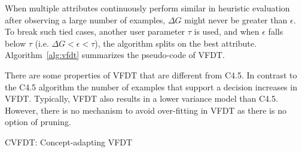 When multiple attributes continuously perform similar in heuristic evaluation after observing a large number of examples, $\Delta G$ might never be greater than $\epsilon$. To break such tied cases, another user parameter $\tau$ is used, and when $\epsilon$ falls below $\tau$ (i.e. $\Delta G < \epsilon <\tau$), the algorithm splits on the best attribute. Algorithm~\ref{alg:vfdt} summarizes the pseudo-code of VFDT.

There are some properties of VFDT that are different from C4.5. In contrast to the C4.5 algorithm the number of examples that support a decision increases in VFDT. Typically, VFDT also results in a lower variance model than C4.5. However, there is no mechanism to avoid over-fitting in VFDT as there is no option of pruning.

\begin{algorithm}[htbp]
    \DontPrintSemicolon
      
    \caption{CVFDT: Concept-adapting VFDT}
    \label{alg:cvfdt}
    
    
\end{algorithm}
